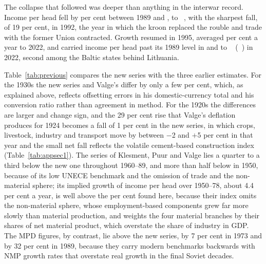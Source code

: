 The collapse that followed was deeper than anything in the interwar record. Income per head fell by \eeTROUGHpct{} per cent between 1989 and \eeTROUGHyear{}, to \eeTROUGHval~\intlnineteen{}, with the sharpest fall, of 19 per cent, in 1992, the year in which the kroon replaced the rouble and trade with the former Union contracted. Growth resumed in 1995, averaged  per cent a year to 2022, and carried income per head past its 1989 level in \eeREGAINnineteen{} and to ~\intlnineteen{} (~\intltwenty{}) in 2022, second among the Baltic states behind Lithuania.

Table~\ref{tab:previous} compares the new series with the three earlier estimates. For the 1930s the new series and Valge's differ by only a few per cent, which, as explained above, reflects offsetting errors in his domestic-currency total and his conversion ratio rather than agreement in method. For the 1920s the differences are larger and change sign, and the 29 per cent rise that Valge's deflation produces for 1924 becomes a fall of 1 per cent in the new series, in which crops, livestock, industry and transport move by between $-$2 and $+$5 per cent in that year and the small net fall reflects the volatile cement-based construction index (Table~\ref{tab:appsec1}). The series of Klesment, Puur and Valge lies a quarter to a third below the new one throughout 1960--89, and more than half below in 1950, because of its low UNECE benchmark and the omission of trade and the non-material sphere; its implied growth of income per head over 1950--78, about 4.4 per cent a year, is well above the  per cent found here, because their index omits the non-material sphere, whose employment-based components grew far more slowly than material production, and weights the four material branches by their shares of net material product, which overstate the share of industry in GDP. The MPD figures, by contrast, lie above the new series, by 7 per cent in 1973 and by 32 per cent in 1989, because they carry modern benchmarks backwards with NMP growth rates that overstate real growth in the final Soviet decades.
